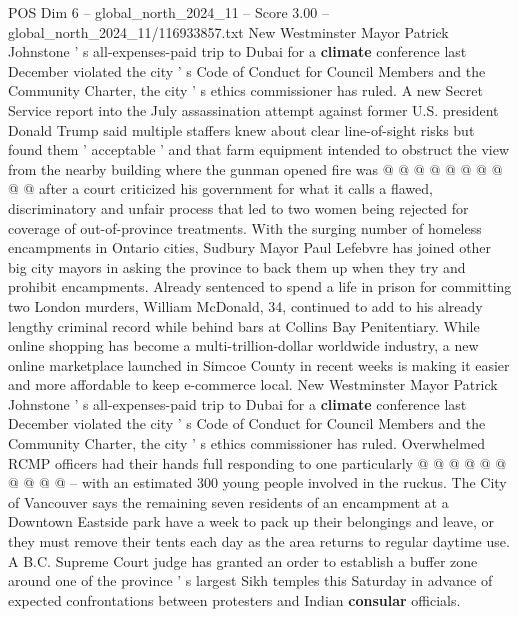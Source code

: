 \begin{textsample}{POS Dim 6 – global\_north\_2024\_11 – Score 3.00 – global\_north\_2024\_11/116933857.txt}
New Westminster Mayor Patrick Johnstone ' s all-expenses-paid trip to Dubai for a \textbf{climate} conference last December violated the city ' s Code of Conduct for Council Members and the Community Charter, the city ' s ethics commissioner has ruled.
A new Secret Service report into the July assassination attempt against former U.S. president Donald Trump said multiple staffers knew about clear line-of-sight risks but found them ' acceptable ' and that farm equipment intended to obstruct the view from the nearby building where the gunman opened fire was @ @ @ @ @ @ @ @ @ @ after a court criticized his government for what it calls a flawed, discriminatory and unfair process that led to two women being rejected for coverage of out-of-province treatments.
With the surging number of homeless encampments in Ontario cities, Sudbury Mayor Paul Lefebvre has joined other big city mayors in asking the province to back them up when they try and prohibit encampments.
Already sentenced to spend a life in prison for committing two London murders, William McDonald, 34, continued to add to his already lengthy criminal record while behind bars at Collins Bay Penitentiary.
While online shopping has become a multi-trillion-dollar worldwide industry, a new online marketplace launched in Simcoe County in recent weeks is making it easier and more affordable to keep e-commerce local.
New Westminster Mayor Patrick Johnstone ' s all-expenses-paid trip to Dubai for a \textbf{climate} conference last December violated the city ' s Code of Conduct for Council Members and the Community Charter, the city ' s ethics commissioner has ruled.
Overwhelmed RCMP officers had their hands full responding to one particularly @ @ @ @ @ @ @ @ @ @ -- with an estimated 300 young people involved in the ruckus.
The City of Vancouver says the remaining seven residents of an encampment at a Downtown Eastside park have a week to pack up their belongings and leave, or they must remove their tents each day as the area returns to regular daytime use.
A B.C.
Supreme Court judge has granted an order to establish a buffer zone around one of the province ' s largest Sikh temples this Saturday in advance of expected confrontations between protesters and Indian \textbf{consular} officials.

\end{textsample}
